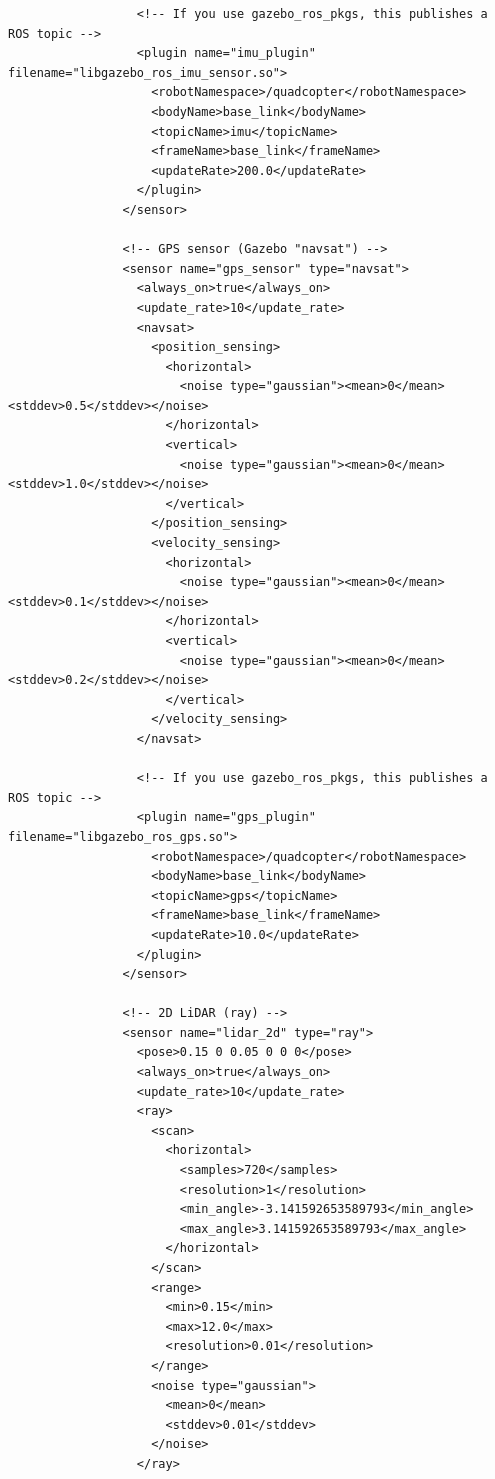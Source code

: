 \documentclass{book}
\begin{document}
\begin{verbatim}
                  <!-- If you use gazebo_ros_pkgs, this publishes a ROS topic -->
                  <plugin name="imu_plugin" filename="libgazebo_ros_imu_sensor.so">
                    <robotNamespace>/quadcopter</robotNamespace>
                    <bodyName>base_link</bodyName>
                    <topicName>imu</topicName>
                    <frameName>base_link</frameName>
                    <updateRate>200.0</updateRate>
                  </plugin>
                </sensor>
        
                <!-- GPS sensor (Gazebo "navsat") -->
                <sensor name="gps_sensor" type="navsat">
                  <always_on>true</always_on>
                  <update_rate>10</update_rate>
                  <navsat>
                    <position_sensing>
                      <horizontal>
                        <noise type="gaussian"><mean>0</mean><stddev>0.5</stddev></noise>
                      </horizontal>
                      <vertical>
                        <noise type="gaussian"><mean>0</mean><stddev>1.0</stddev></noise>
                      </vertical>
                    </position_sensing>
                    <velocity_sensing>
                      <horizontal>
                        <noise type="gaussian"><mean>0</mean><stddev>0.1</stddev></noise>
                      </horizontal>
                      <vertical>
                        <noise type="gaussian"><mean>0</mean><stddev>0.2</stddev></noise>
                      </vertical>
                    </velocity_sensing>
                  </navsat>
        
                  <!-- If you use gazebo_ros_pkgs, this publishes a ROS topic -->
                  <plugin name="gps_plugin" filename="libgazebo_ros_gps.so">
                    <robotNamespace>/quadcopter</robotNamespace>
                    <bodyName>base_link</bodyName>
                    <topicName>gps</topicName>
                    <frameName>base_link</frameName>
                    <updateRate>10.0</updateRate>
                  </plugin>
                </sensor>
        
                <!-- 2D LiDAR (ray) -->
                <sensor name="lidar_2d" type="ray">
                  <pose>0.15 0 0.05 0 0 0</pose>
                  <always_on>true</always_on>
                  <update_rate>10</update_rate>
                  <ray>
                    <scan>
                      <horizontal>
                        <samples>720</samples>
                        <resolution>1</resolution>
                        <min_angle>-3.141592653589793</min_angle>
                        <max_angle>3.141592653589793</max_angle>
                      </horizontal>
                    </scan>
                    <range>
                      <min>0.15</min>
                      <max>12.0</max>
                      <resolution>0.01</resolution>
                    </range>
                    <noise type="gaussian">
                      <mean>0</mean>
                      <stddev>0.01</stddev>
                    </noise>
                  </ray>
        

\end{verbatim}
\end{document}
